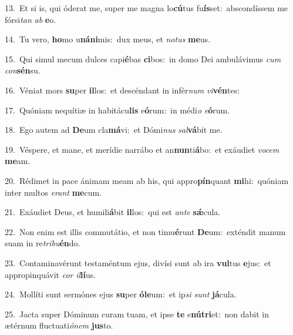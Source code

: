{\numbfont\textcolor{\numbcolor}{13.}}~Et si is, qui óderat me, super me magna lo\-\textbf{cú}\-tus fu\-\textbf{ís}\-set:~\star abscondíssem me fórsi\textit{tan} \textit{ab} \textbf{e}\-o.\par
{\numbfont\textcolor{\numbcolor}{14.}}~Tu vero, \textbf{ho}\-mo u\-\textbf{ná}\-\textbf{ni}mis:~\star dux meus, et \textit{no}\-\textit{tus} \textbf{me}\-us.\par
{\numbfont\textcolor{\numbcolor}{15.}}~Qui simul mecum dulces capi\-\textbf{é}\-bas \textbf{ci}\-bos:~\star in domo Dei ambulávimus \textit{cum} \textit{con}\-\textbf{sén}su.\par
{\numbfont\textcolor{\numbcolor}{16.}}~Véniat mors \textbf{su}\-per \textbf{il}\-los:~\star et descéndant in infér\textit{num} \textit{vi}\-\textbf{vén}tes:\par
{\numbfont\textcolor{\numbcolor}{17.}}~Quóniam nequítiæ in habitácu\textbf{lis} e\-\textbf{ó}\-rum:~\star in médi\textit{o} \textit{e}\-\textbf{ó}rum.\par
{\numbfont\textcolor{\numbcolor}{18.}}~Ego autem ad \textbf{De}\-um cla\-\textbf{má}\-vi:~\star et Dómi\textit{nus} \textit{sal}\-\textbf{vá}bit me.\par
{\numbfont\textcolor{\numbcolor}{19.}}~Véspere, et mane, et merídie narrábo et an\-\textbf{nun}\-ti\-\textbf{á}\-bo:~\star et exáudiet \textit{vo}\-\textit{cem} \textbf{me}\-am.\par
{\numbfont\textcolor{\numbcolor}{20.}}~Rédimet in pace ánimam meam ab his, qui appro\-\textbf{pín}\-quant \textbf{mi}\-hi:~\star quóniam inter multos \textit{e}\-\textit{rant} \textbf{me}\-cum.\par
{\numbfont\textcolor{\numbcolor}{21.}}~Exáudiet Deus, et humili\-\textbf{á}\-bit \textbf{il}\-los:~\star qui est \textit{an}\-\textit{te} \textbf{sǽ}\-cula.\par
{\numbfont\textcolor{\numbcolor}{22.}}~Non enim est illis commutátio, et non timu\-\textbf{é}\-runt \textbf{De}\-um:~\star exténdit manum suam in re\-\textit{tri}\-\textit{bu}\textbf{én}do.\par
{\numbfont\textcolor{\numbcolor}{23.}}~Contaminavérunt testaméntum ejus, divísi sunt ab ira \textbf{vul}\-tus \textbf{e}\-jus:~\star et appropinquávit \textit{cor} \textit{il}\-\textbf{lí}us.\par
{\numbfont\textcolor{\numbcolor}{24.}}~Mollíti sunt sermónes ejus \textbf{su}\-per \textbf{ó}\-\textbf{le}um:~\star et ip\textit{si} \textit{sunt} \textbf{já}\-cula.\par
{\numbfont\textcolor{\numbcolor}{25.}}~Jacta super Dóminum curam tuam, et ipse \textbf{te} e\-\textbf{nú}\-\textbf{tri}et:~\star non dabit in ætérnum fluctuati\-\textit{ó}\-\textit{nem} \textbf{jus}\-to.\par
